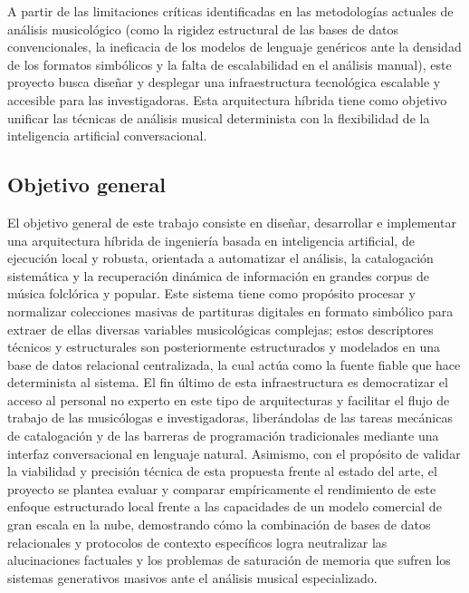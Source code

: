 A partir de las limitaciones críticas identificadas en las metodologías actuales de análisis musicológico (como la rigidez estructural de las bases de datos convencionales, la ineficacia de los modelos de lenguaje genéricos ante la densidad de los formatos simbólicos y la falta de escalabilidad en el análisis manual), este proyecto busca diseñar y desplegar una infraestructura tecnológica escalable y accesible para las investigadoras. Esta arquitectura híbrida tiene como objetivo unificar las técnicas de análisis musical determinista con la flexibilidad de la inteligencia artificial conversacional.

\subsection{Objetivo general}

El objetivo general de este trabajo consiste en diseñar, desarrollar e implementar una arquitectura híbrida de ingeniería basada en inteligencia artificial, de ejecución local y robusta, orientada a automatizar el análisis, la catalogación sistemática y la recuperación dinámica de información en grandes corpus de música folclórica y popular. Este sistema tiene como propósito procesar y normalizar colecciones masivas de partituras digitales en formato simbólico para extraer de ellas diversas variables musicológicas complejas; estos descriptores técnicos y estructurales son posteriormente estructurados y modelados en una base de datos relacional centralizada, la cual actúa como la fuente fiable que hace determinista al sistema. El fin último de esta infraestructura es democratizar el acceso al personal no experto en este tipo de arquitecturas y facilitar el flujo de trabajo de las musicólogas e investigadoras, liberándolas de las tareas mecánicas de catalogación y de las barreras de programación tradicionales mediante una interfaz conversacional en lenguaje natural. Asimismo, con el propósito de validar la viabilidad y precisión técnica de esta propuesta frente al estado del arte, el proyecto se plantea evaluar y comparar empíricamente el rendimiento de este enfoque estructurado local frente a las capacidades de un modelo comercial de gran escala en la nube, demostrando cómo la combinación de bases de datos relacionales y protocolos de contexto específicos logra neutralizar las alucinaciones factuales y los problemas de saturación de memoria que sufren los sistemas generativos masivos ante el análisis musical especializado.

